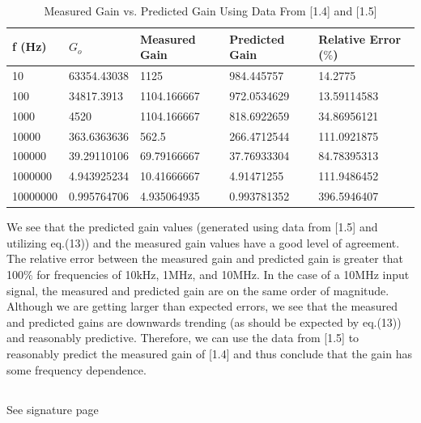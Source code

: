 \documentclass{article}
\begin{document}
    \begin{table}[H]
        \centering
        \caption{Measured Gain vs. Predicted Gain Using Data From [1.4] and [1.5]}
        \label{my-label}
        \begin{tabular}{lllll}
        \textbf{f (Hz)} & \textbf{$G_o$} & \textbf{Measured Gain} & \textbf{Predicted Gain} & \textbf{Relative Error ($\%$)} \\ \hline
        10 & 63354.43038 & 1125 & 984.445757 & 14.2775 \\
        100 & 34817.3913 & 1104.166667 & 972.0534629 & 13.59114583 \\
        1000 & 4520 & 1104.166667 & 818.6922659 & 34.86956121 \\
        10000 & 363.6363636 & 562.5 & 266.4712544 & 111.0921875 \\
        100000 & 39.29110106 & 69.79166667 & 37.76933304 & 84.78395313 \\
        1000000 & 4.943925234 & 10.41666667 & 4.91471255 & 111.9486452 \\
        10000000 & 0.995764706 & 4.935064935 & 0.993781352 & 396.5946407
        \end{tabular}
        \end{table}
    \indent We see that the predicted gain values (generated using data from [1.5] and utilizing eq.(13)) and the measured gain values have a good level of agreement. The relative error between the measured gain and predicted gain is greater that 100$\%$ for frequencies of 10kHz, 1MHz, and 10MHz. In the case of a 10MHz input signal, the measured and predicted gain are on the same order of magnitude. Although we are getting larger than expected errors, we see that the measured and predicted gains are downwards trending (as should be expected by eq.(13)) and reasonably predictive. Therefore, we can use the data from [1.5] to reasonably predict the measured gain of [1.4] and thus conclude that the gain has some frequency dependence.

\subsection{}
    See signature page
\end{document}
